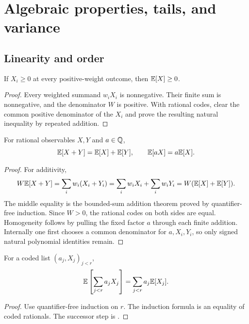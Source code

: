 \section{Algebraic properties, tails, and variance}\label{sec:properties}

\subsection{Linearity and order}

\begin{theorem}[Nonnegativity]\label{thm:nonneg}
If \(X_i\ge0\) at every positive-weight outcome, then \(\mathbb E[X]\ge0\).
\end{theorem}

\begin{proof}
Every weighted summand \(w_iX_i\) is nonnegative.  Their finite sum is
nonnegative, and the denominator \(W\) is positive.  With rational codes,
clear the common positive denominator of the \(X_i\) and prove the resulting
natural inequality by repeated addition.
\end{proof}

\begin{theorem}\label{thm:linearity}
For rational observables \(X,Y\) and \(a\in\mathbb Q\),
\[
 \mathbb E[X+Y]=\mathbb E[X]+\mathbb E[Y],\qquad
 \mathbb E[aX]=a\mathbb E[X].
\]
\end{theorem}

\begin{proof}
For additivity,
\[
 W\mathbb E[X+Y]=\sum_iw_i(X_i+Y_i)
 =\sum_iw_iX_i+\sum_iw_iY_i
 =W(\mathbb E[X]+\mathbb E[Y]).
\]
The middle equality is the bounded-sum addition theorem proved by
quantifier-free induction.  Since \(W>0\), the rational codes on both sides are
equal.  Homogeneity follows by pulling the fixed factor \(a\) through each
finite addition.  Internally one first chooses a common denominator for
\(a,X_i,Y_i\), so only signed natural polynomial identities remain.
\end{proof}

\begin{corollary}\label{cor:finite-linearity}
For a coded list \((a_j,X_j)_{j<r}\),
\[
 \mathbb E\left[\sum_{j<r}a_jX_j\right]
 =\sum_{j<r}a_j\mathbb E[X_j].
\]
\end{corollary}

\begin{proof}
Use quantifier-free induction on \(r\).  The induction formula is an equality
of coded rationals.  The successor step is .
\end{proof}

